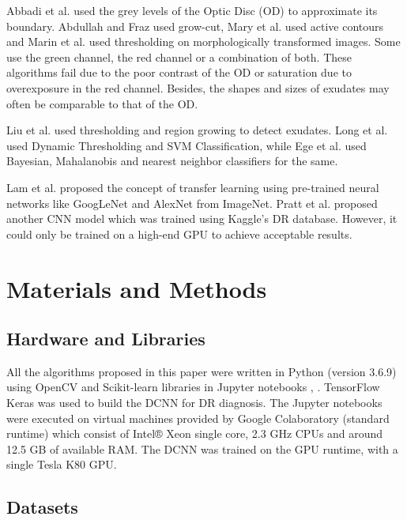 \documentclass{svproc}
\begin{document}
Abbadi et al. \cite{abbadi} used the grey levels of the Optic Disc (OD) to approximate its boundary. Abdullah and Fraz \cite{abdullah} used grow-cut, Mary et al. \cite{mary} used active contours and Marin et al. \cite{marin} used thresholding on morphologically transformed images. Some use the green channel, the red channel or a combination of both. These algorithms fail due to the poor contrast of the OD or saturation due to overexposure in the red channel. Besides, the shapes and sizes of exudates may often be comparable to that of the OD.

Liu et al. \cite{liu} used thresholding and region growing to detect exudates. Long et al. \cite{long} used Dynamic Thresholding and SVM Classification, while Ege et al. \cite{ege} used Bayesian, Mahalanobis and nearest neighbor classifiers for the same.

Lam et al. \cite{lam} proposed the concept of transfer learning using pre-trained neural networks like GoogLeNet and AlexNet from ImageNet. Pratt et al. \cite{pratt} proposed another CNN model which was trained using Kaggle’s DR database. However, it could only be trained on a high-end GPU to achieve acceptable results.


\section{Materials and Methods}


\subsection{Hardware and Libraries}

All the algorithms proposed in this paper were written in Python (version 3.6.9) using OpenCV and Scikit-learn libraries in Jupyter notebooks \cite{opencv}, \cite{scikit}. TensorFlow Keras was used to build the DCNN for DR diagnosis. The Jupyter notebooks were executed on virtual machines provided by Google Colaboratory (standard runtime) which consist of Intel® Xeon single core, 2.3 GHz CPUs and around 12.5 GB of available RAM. The DCNN was trained on the GPU runtime, with a single Tesla K80 GPU.



\subsection{Datasets}
\end{document}
